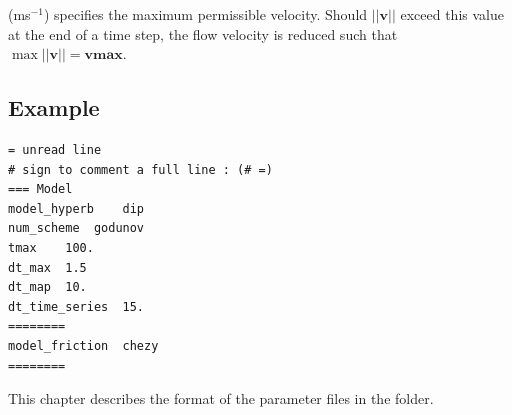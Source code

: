 \begin{description}

\item[vmax] (ms$^{-1}$)  specifies the maximum permissible velocity. Should $||\mathbf{v}||$ exceed this value at the end of a time step, the flow velocity is reduced such that $\max ||\mathbf{v}|| = \mathbf{vmax} $.



\end{description}

\subsection{Example}
\begin{verbatim}
= unread line
# sign to comment a full line : (# =)
=== Model
model_hyperb	dip
num_scheme	godunov
tmax	100.
dt_max	1.5
dt_map	10.
dt_time_series	15.
========
model_friction	chezy
========
\end{verbatim}
This chapter describes the format of the parameter files in the  folder.

